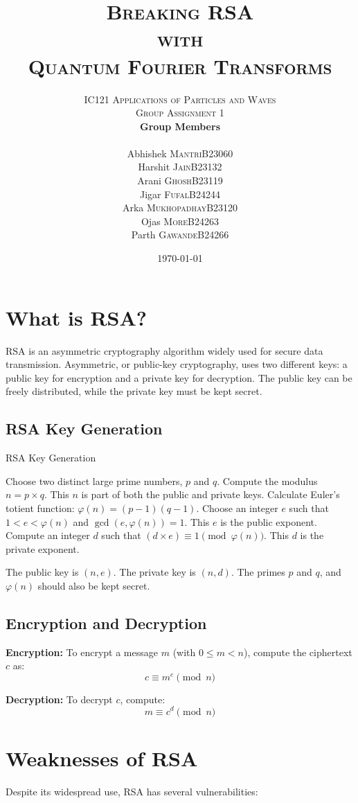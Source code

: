 \documentclass{article}
\title{\Huge\textsc{Breaking RSA \\ with \\ Quantum Fourier Transforms}}
\author{
    \Large\textsc{\vspace{2cm} IC121 Applications of Particles and Waves}\\[2ex]
        \LARGE\textsc{Group Assignment 1}\vspace{3cm}\\[2ex]
        \textbf{\Large Group Members}\vspace{0.5cm}\\[1ex]
        \begin{tabular}{r|l} 
            Abhishek \textsc{Mantri}        & B23060 \\ 
            Harshit \textsc{Jain}           & B23132 \\
            Arani \textsc{Ghosh}            & B23119 \\
            Jigar \textsc{Fufal}            & B24244 \\
            Arka \textsc{Mukhopadhay}       & B23120 \\
            Ojas \textsc{More}              & B24263 \\
            Parth \textsc{Gawande}          & B24266 \\ 
            \hline \hline
        \end{tabular}
        \vspace{2cm}
}
\date{\today}
\begin{document}
\maketitle
\newpage
\tableofcontents
\newpage

\section{What is RSA?}

RSA is an asymmetric cryptography algorithm widely used for secure data transmission. Asymmetric, or public-key cryptography, uses two different keys: a public key for encryption and a private key for decryption. The public key can be freely distributed, while the private key must be kept secret.

\subsection{RSA Key Generation}

\begin{algorithm}
    \caption{RSA Key Generation}
    \begin{algorithmic}[1]
        \State Choose two distinct large prime numbers, $p$ and $q$.
        \State Compute the modulus $n = p \times q$. This $n$ is part of both the public and private keys.
        \State Calculate Euler's totient function: $\varphi(n) = (p - 1)(q - 1)$.
        \State Choose an integer $e$ such that $1 < e < \varphi(n)$ and $\gcd(e, \varphi(n)) = 1$. This $e$ is the public exponent.
        \State Compute an integer $d$ such that $(d \times e) \equiv 1 \pmod{\varphi(n)}$. This $d$ is the private exponent.
    \end{algorithmic}
\end{algorithm}

The public key is $(n, e)$. The private key is $(n, d)$. The primes $p$ and $q$, and $\varphi(n)$ should also be kept secret.

\subsection{Encryption and Decryption}

\textbf{Encryption:} To encrypt a message $m$ (with $0 \leq m < n$), compute the ciphertext $c$ as:
\[
    c \equiv m^e \pmod{n}
\]

\textbf{Decryption:} To decrypt $c$, compute:
\[
    m \equiv c^d \pmod{n}
\]

\section{Weaknesses of RSA}
Despite its widespread use, RSA has several vulnerabilities:
\end{document}
